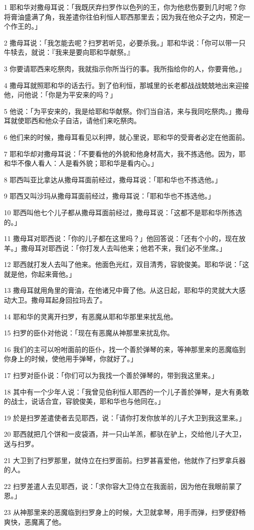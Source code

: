 \par 1 耶和华对撒母耳说：「我既厌弃扫罗作以色列的王，你为他悲伤要到几时呢？你将膏油盛满了角，我差遣你往伯利恒人耶西那里去；因为我在他众子之内，预定一个作王的。」
\par 2 撒母耳说：「我怎能去呢？扫罗若听见，必要杀我。」耶和华说：「你可以带一只牛犊去，就说：『我来是要向耶和华献祭。』
\par 3 你要请耶西来吃祭肉，我就指示你所当行的事。我所指给你的人，你要膏他。」
\par 4 撒母耳就照耶和华的话去行。到了伯利恒，那城里的长老都战战兢兢地出来迎接他，问他说：「你是为平安来的吗？」
\par 5 他说：「为平安来的，我是给耶和华献祭。你们当自洁，来与我同吃祭肉。」撒母耳就使耶西和他众子自洁，请他们来吃祭肉。
\par 6 他们来的时候，撒母耳看见以利押，就心里说，耶和华的受膏者必定在他面前。
\par 7 耶和华却对撒母耳说：「不要看他的外貌和他身材高大，我不拣选他。因为，耶和华不像人看人：人是看外貌；耶和华是看内心。」
\par 8 耶西叫亚比拿达从撒母耳面前经过，撒母耳说：「耶和华也不拣选他。」
\par 9 耶西又叫沙玛从撒母耳面前经过，撒母耳说：「耶和华也不拣选他。」
\par 10 耶西叫他七个儿子都从撒母耳面前经过，撒母耳说：「这都不是耶和华所拣选的。」
\par 11 撒母耳对耶西说：「你的儿子都在这里吗？」他回答说：「还有个小的，现在放羊。」撒母耳对耶西说：「你打发人去叫他来；他若不来，我们必不坐席。」
\par 12 耶西就打发人去叫了他来。他面色光红，双目清秀，容貌俊美。耶和华说：「这就是他，你起来膏他。」
\par 13 撒母耳就用角里的膏油，在他诸兄中膏了他。从这日起，耶和华的灵就大大感动大卫。撒母耳起身回拉玛去了。
\par 14 耶和华的灵离开扫罗，有恶魔从耶和华那里来扰乱他。
\par 15 扫罗的臣仆对他说：「现在有恶魔从神那里来扰乱你。
\par 16 我们的主可以吩咐面前的臣仆，找一个善於弹琴的来，等神那里来的恶魔临到你身上的时候，使他用手弹琴，你就好了。」
\par 17 扫罗对臣仆说：「你们可以为我找一个善於弹琴的，带到我这里来。」
\par 18 其中有一个少年人说：「我曾见伯利恒人耶西的一个儿子善於弹琴，是大有勇敢的战士，说话合宜，容貌俊美，耶和华也与他同在。」
\par 19 於是扫罗差遣使者去见耶西，说：「请你打发你放羊的儿子大卫到我这里来。」
\par 20 耶西就把几个饼和一皮袋酒，并一只山羊羔，都驮在驴上，交给他儿子大卫，送与扫罗。
\par 21 大卫到了扫罗那里，就侍立在扫罗面前。扫罗甚喜爱他，他就作了扫罗拿兵器的人。
\par 22 扫罗差遣人去见耶西，说：「求你容大卫侍立在我面前，因为他在我眼前蒙了恩。」
\par 23 从神那里来的恶魔临到扫罗身上的时候，大卫就拿琴，用手而弹，扫罗便舒畅爽快，恶魔离了他。

